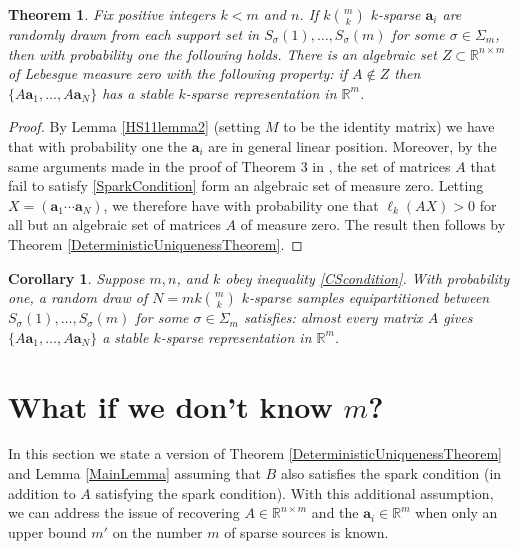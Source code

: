 \documentclass[journal, onecolumn]{IEEEtran}
\newtheorem{theorem}{Theorem}
\newtheorem{corollary}{Corollary}
\begin{document}
\begin{theorem}\label{Theorem3}
Fix positive integers $k < m$ and $n$. If $k{m \choose k}$ $k$-sparse $\mathbf{a}_i$ are randomly drawn from each support set in $S_\sigma(1), \ldots, S_\sigma(m)$ for some $\sigma \in \Sigma_m$, then with probability one the following holds. There is an algebraic set $Z \subset \mathbb{R}^{n \times m}$ of Lebesgue measure zero with the following property: if $A \notin Z$ then $\{A\mathbf{a}_1, \ldots , A\mathbf{a}_N \}$ has a stable $k$-sparse representation in $\mathbb{R}^m$.
\end{theorem}

\begin{proof}
By Lemma \ref{HS11lemma2} (setting $M$ to be the identity matrix) we have that with probability one the $\mathbf{a}_i$ are in general linear position. Moreover, by the same arguments made in the proof of Theorem 3 in \cite{HS11}, the set of matrices $A$ that fail to satisfy \eqref{SparkCondition} form an algebraic set of measure zero. Letting $X = (\mathbf{a}_1 \cdots \mathbf{a}_N)$, we therefore have with probability one that $\ell_k(AX) > 0$ for all but an algebraic set of matrices $A$ of measure zero. The result then follows by Theorem \ref{DeterministicUniquenessTheorem}.
\end{proof}

\begin{corollary}
Suppose $m, n$, and $k$ obey inequality \eqref{CScondition}. With probability one, a random draw of $N = mk{m \choose k}$ $k$-sparse samples equipartitioned between $S_\sigma(1), \ldots, S_\sigma(m)$ for some $\sigma \in \Sigma_m$ satisfies: almost every matrix $A$ gives $\{A\mathbf{a}_1, \ldots , A\mathbf{a}_N \}$ a stable $k$-sparse representation in $\mathbb{R}^m$.
\end{corollary}


\section{What if we don't know $m$?}\label{mleqm}

In this section we state a version of Theorem \ref{DeterministicUniquenessTheorem} and Lemma \ref{MainLemma} assuming that $B$ also satisfies the spark condition (in addition to $A$ satisfying the spark condition). With this additional assumption, we can address the issue of recovering $A \in \mathbb{R}^{n \times m}$ and the $\mathbf{a}_i \in \mathbb{R}^m$ when only an upper bound $m'$ on the number $m$ of sparse sources is known.
\end{document}
